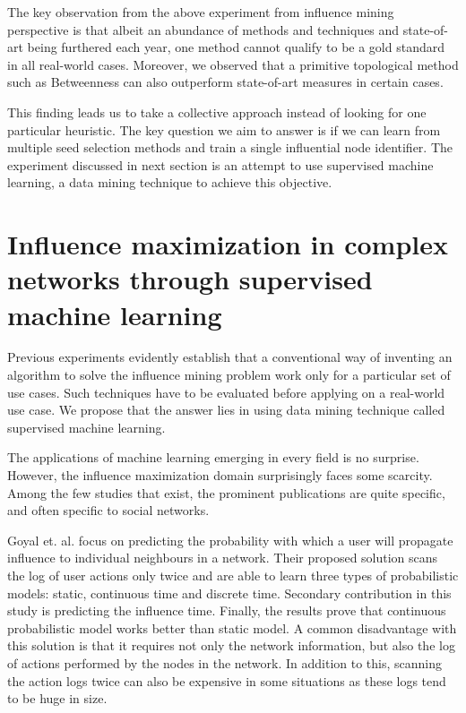 	The key observation from the above experiment from influence mining perspective is that albeit an abundance of methods and techniques and state-of-art being furthered each year, one method cannot qualify to be a gold standard in all real-world cases. Moreover, we observed that a primitive topological method such as Betweenness can also outperform state-of-art measures in certain cases.
	
	This finding leads us to take a collective approach instead of looking for one particular heuristic. The key question we aim to answer is if we can learn from multiple seed selection methods and train a single influential node identifier. The experiment discussed in next section is an attempt to use supervised machine learning, a data mining technique to achieve this objective.
	
	
	\section{Influence maximization in complex networks through supervised machine learning}
	\label{sec:inf-max-machine-learning}
	Previous experiments evidently establish that a conventional way of inventing an algorithm to solve the influence mining problem work only for a particular set of use cases. Such techniques have to be evaluated before applying on a real-world use case. We propose that the answer lies in using data mining technique called supervised machine learning.
	
	The applications of machine learning emerging in every field is no surprise. However, the influence maximization domain surprisingly faces some scarcity. Among the few studies that exist, the prominent publications are quite specific, and often specific to social networks.
	
	Goyal et. al. \cite{goyal2010} focus on predicting the probability with which a user will propagate influence to individual neighbours in a network. Their proposed solution scans the log of user actions only twice and are able to learn three types of probabilistic models: static, continuous time and discrete time. Secondary contribution in this study is predicting the influence time. Finally, the results prove that continuous probabilistic model works better than static model. A common disadvantage with this solution is that it requires not only the network information, but also the log of actions performed by the nodes in the network. In addition to this, scanning the action logs twice can also be expensive in some situations as these logs tend to be huge in size.
	
